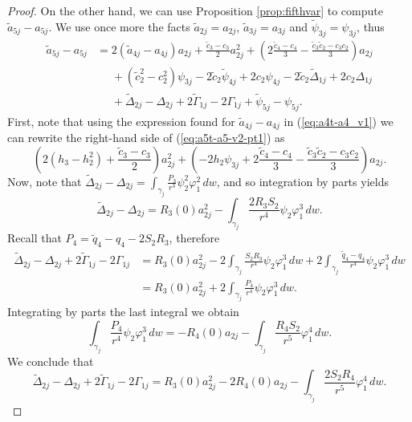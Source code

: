 \begin{proof}
On the other hand, we can use Proposition \ref{prop:fifthvar} to compute $\tilde{a}_{5j}-a_{5j}$. We use once more the facts $\tilde{a}_{2j}=a_{2j}$, $\tilde{a}_{3j}=a_{3j}$ and $\tilde{\psi}_{3j}=\psi_{3j}$, thus
\begin{align}
 \tilde{a}_{5j}-a_{5j} 
&=		2(\tilde{a}_{4j}-a_{4j})a_{2j}+\frac{\tilde{c}_3-c_3}{2}a_{2j}^2+\left(2\frac{\tilde{c}_4-c_4}{3}-\frac{\tilde{c}_3\tilde{c}_2-c_3c_2}{3}\right)a_{2j} \label{eq:a5t-a5-v2-pt1} \\
&\phantom{=}	+(\tilde{c}_2^2-c_2^2)\psi_{3j}-2\tilde{c}_2\tilde{\psi}_{4j}+2c_2\psi_{4j}-2\tilde{c}_2\widetilde{\Delta}_{1j}+2c_2\Delta_{1j} \label{eq:a5t-a5-v2-pt2} \\
&\phantom{=}	+\widetilde{\Delta}_{2j}-\Delta_{2j}+2\widetilde{\Gamma}_{1j}-2\Gamma_{1j}+\tilde{\psi}_{5j}-\psi_{5j}. \label{eq:a5t-a5-v2-pt3}
\end{align}
First, note that using the expression found for $\tilde{a}_{4j}-a_{4j}$ in (\ref{eq:a4t-a4_v1}) we can rewrite the right-hand side of (\ref{eq:a5t-a5-v2-pt1}) as
\begin{equation}\label{eq:a5t-a5-PQ}
 \left(2(h_3-h_2^2)+\frac{\tilde{c}_3-c_3}{2}\right)a_{2j}^2+\left(-2h_2\psi_{3j}+2\frac{\tilde{c}_4-c_4}{3}-\frac{\tilde{c}_3\tilde{c}_2-c_3c_2}{3}\right)a_{2j}.
\end{equation}
Now, note that $\widetilde{\Delta}_{2j}-\Delta_{2j}=\int_{\gamma_j}\frac{P_3}{r^3}\psi_2^2\varphi_1^2\,dw$, and so integration by parts yields
\begin{equation}\label{formula:Delta2t-Delta2}
 \widetilde{\Delta}_{2j}-\Delta_{2j}=R_3(0)a_{2j}^2-\int_{\gamma_j}\frac{2R_3S_2}{r^4}\psi_2\varphi_1^3\,dw. 
\end{equation}
Recall that $P_4=\tilde{q}_4-q_4-2S_2R_3$, therefore
\begin{align*}
\widetilde{\Delta}_{2j}-\Delta_{2j}+2\widetilde{\Gamma}_{1j}-2\Gamma_{1j}
&= R_3(0)a_{2j}^2-2\int_{\gamma_j}\frac{S_2R_3}{r^4}\psi_2\varphi_1^3\,dw+2\int_{\gamma_j}\frac{\tilde{q}_4-q_4}{r^4}\psi_2\varphi_1^3\,dw \\
&= R_3(0)a_{2j}^2+2\int_{\gamma_j}\frac{P_4}{r^4}\psi_2\varphi_1^3\,dw.
\end{align*}
Integrating by parts the last integral we obtain
\[ \int_{\gamma_j}\frac{P_4}{r^4}\psi_2\varphi_1^3\,dw=-R_4(0)a_{2j}-\int_{\gamma_j}\frac{R_4S_2}{r^5}\varphi_1^4\,dw. \]
We conclude that
\[ \widetilde{\Delta}_{2j}-\Delta_{2j}+2\widetilde{\Gamma}_{1j}-2\Gamma_{1j} = R_3(0)a_{2j}^2-2R_4(0)a_{2j}-\int_{\gamma_j}\frac{2S_2R_4}{r^5}\varphi_1^4\,dw. \]

\end{proof}
